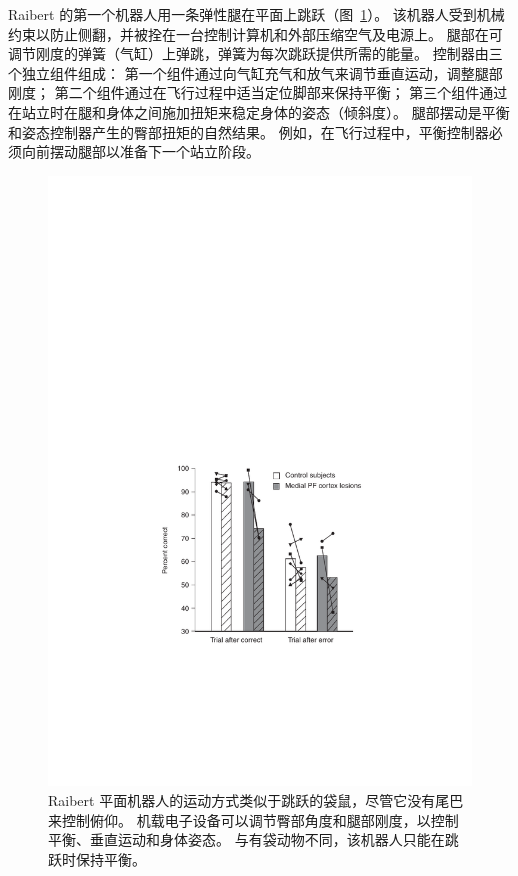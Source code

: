 Raibert 的第一个机器人用一条弹性腿在平面上跳跃（图~\ref{fig:3_8}）。
该机器人受到机械约束以防止侧翻，并被拴在一台控制计算机和外部压缩空气及电源上。
腿部在可调节刚度的弹簧（气缸）上弹跳，弹簧为每次跳跃提供所需的能量。
控制器由三个独立组件组成：
第一个组件通过向气缸充气和放气来调节垂直运动，调整腿部刚度；
第二个组件通过在飞行过程中适当定位脚部来保持平衡；
第三个组件通过在站立时在腿和身体之间施加扭矩来稳定身体的姿态（倾斜度）。
腿部摆动是平衡和姿态控制器产生的臀部扭矩的自然结果。
例如，在飞行过程中，平衡控制器必须向前摆动腿部以准备下一个站立阶段。

\begin{figure}[!htb]
	\centering
	\includegraphics[width=1.0\linewidth]{chap3/3_8}
	\caption{Raibert 平面机器人的运动方式类似于跳跃的袋鼠，尽管它没有尾巴来控制俯仰。
		机载电子设备可以调节臀部角度和腿部刚度，以控制平衡、垂直运动和身体姿态。
		与有袋动物不同，该机器人只能在跳跃时保持平衡\cite{raibert1984machines}。 \label{fig:3_8}}
\end{figure}


